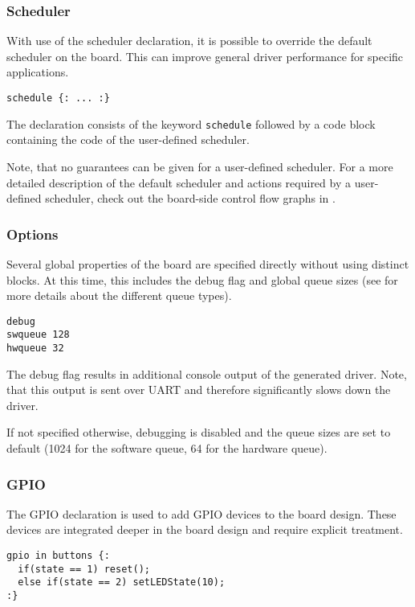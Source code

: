 \documentclass{report}
\begin{document}
\subsubsection{Scheduler}
With use of the scheduler declaration, it is possible to override the default scheduler on the board. This can improve general driver performance for specific applications.

\begin{lstlisting}[language=bdl]
schedule {: ... :}
\end{lstlisting}

The declaration consists of the keyword \texttt{schedule} followed by a code block containing the code of the user-defined scheduler.

Note, that no guarantees can be given for a user-defined scheduler. For a more detailed description of the default scheduler and actions required by a user-defined scheduler, check out the board-side control flow graphs in .

\subsubsection{Options}
Several global properties of the board are specified directly without using distinct blocks. At this time, this includes the debug flag and global queue sizes (see  for more details about the different queue types).

\begin{lstlisting}[language=bdl]
debug
swqueue 128
hwqueue 32
\end{lstlisting}

The debug flag results in additional console output of the generated driver. Note, that this output is sent over UART and therefore significantly slows down the driver.

If not specified otherwise, debugging is disabled and the queue sizes are set to default (1024 for the software queue, 64 for the hardware queue).

\subsubsection{GPIO}
The GPIO declaration is used to add GPIO devices to the board design. These devices are integrated deeper in the board design and require explicit treatment.

\begin{lstlisting}[language=bdl]
gpio in buttons {:
  if(state == 1) reset();
  else if(state == 2) setLEDState(10);
:}
\end{lstlisting}
\end{document}
